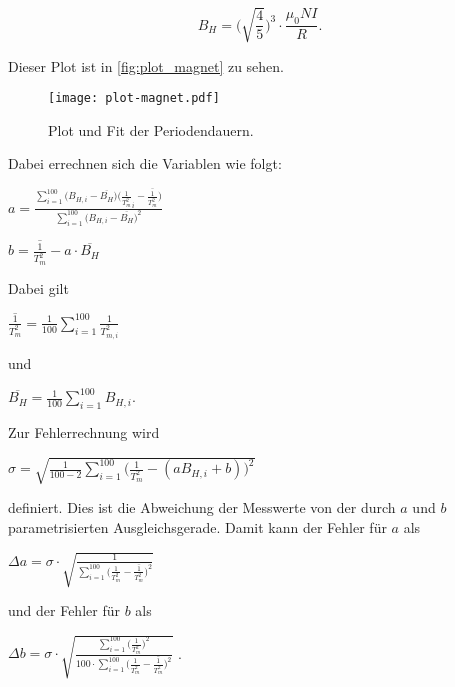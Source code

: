 \begin{equation}
    B_H = \bigg( \sqrt{\frac{4}{5}} \bigg)^3 \cdot \frac{\mu_0 N I}{R}.
\end{equation}

Dieser Plot ist in \autoref{fig:plot_magnet} zu sehen.

\begin{figure}
  \centering
  \texttt{[image: plot-magnet.pdf]}
  \caption{Plot und Fit der Periodendauern.}
  \label{fig:plot_magnet}
\end{figure}

Dabei errechnen sich die Variablen wie folgt:

\vspace{.5em}
\centerline{$a = \frac{\sum_{i=1}^{100} \Big(B_{H,i} - \overline{B_H}\Big) \Big(\frac{1}{T_m^2}_i - \overline{\frac{1}{T_m^2}}\Big)}{\sum_{i=1}^{100} \Big(B_{H,i} - \overline{B_H}\Big)^2}$}
\vspace{1em}
\centerline{$b = \overline{\frac{1}{T_m^2}} - a \cdot \overline{B_H}$}
\vspace{.5em}

Dabei gilt

\vspace{.5em}
\centerline{$\overline{\frac{1}{T_m^2}} = \frac{1}{100} \sum_{i=1}^{100} \frac{1}{T_{m,i}^2}$}

und

\centerline{$\overline{B_H} = \frac{1}{100} \sum_{i=1}^{100} B_{H,i}$.}
\vspace{.5em}

Zur Fehlerrechnung wird

\vspace{.5em}
\centerline{$\sigma = \sqrt{\frac{1}{100 - 2} \sum_{i=1}^{100} \Big( \frac{1}{T_m^2} - (a B_{H, i} + b) \Big)^2}$ }
\vspace{.5em}

definiert. Dies ist die Abweichung der Messwerte von der durch $a$ und $b$ parametrisierten Ausgleichsgerade. Damit kann der Fehler für $a$ als

\vspace{.5em}
\centerline{$\Delta a = \sigma \cdot \sqrt{ \frac{1}{\sum_{i=1}^{100} \Big( \frac{1}{T_m^2} - \overline{\frac{1}{T_m^2}} \Big)^2 } } $}
\vspace{.5em}

und der Fehler für $b$ als 

\vspace{.5em}
\centerline{$\Delta b = \sigma \cdot \sqrt{ \frac{\sum_{i=1}^{100} \Big( \frac{1}{T_m^2} \Big)^2 }{ 100 \cdot \sum_{i=1}^{100} \Big( \frac{1}{T_m^2} - \overline{\frac{1}{T_m^2}} \Big)^2 } }$ .}
\vspace{.5em}

